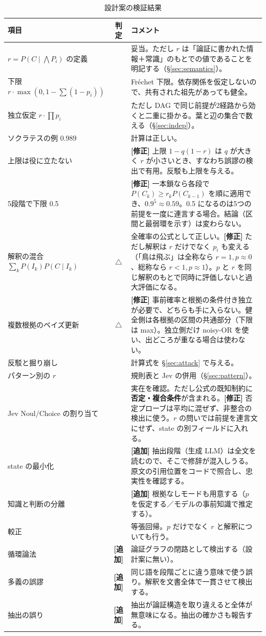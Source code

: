 \documentclass[a4paper,11pt]{ltjsarticle}
\newcommand{\okmark}{\ding{51}}
\newcommand{\ngmark}{\ding{55}}
\newcommand{\fix}[1]{\textcolor{blue!60!black}{\textbf{[修正]} #1}}
\newcommand{\add}[1]{\textcolor{green!40!black}{\textbf{[追加]} #1}}
\begin{document}
\begin{table}[htbp]
\centering
\caption{設計案の検証結果}\label{tab:review}
\small
\begin{tabularx}{\linewidth}{lcX}
\toprule
項目 & 判定 & コメント \\
\midrule
$r = P(C\mid \bigwedge P_i)$ の定義 & \okmark & 妥当。ただし $r$ は「論証に書かれた情報＋常識」のもとでの値であることを明記する（§\ref{sec:semantics}）。\\
下限 $r\cdot\max(0,1-\sum(1-p_i))$ & \okmark & Fréchet 下限。依存関係を仮定しないので、共有された祖先があっても健全。\\
独立仮定 $r\cdot\prod p_i$ & \okmark & ただし DAG で同じ前提が2経路から効くと二重に掛かる。葉と辺の集合で数える（§\ref{sec:indep}）。\\
ソクラテスの例 $0.989$ & \okmark & 計算は正しい。\\
上限は役に立たない & \ngmark & \fix{上限 $1-q(1-r)$ は $q$ が大きく $r$ が小さいとき、すなわち誤謬の検出で有用。反駁も上限を与える。}\\
5段階で下限 0.5 & \ngmark & \fix{一本鎖なら各段で $P(C_k)\ge r_k P(C_{k-1})$ を順に適用でき、$0.9^5\approx0.59$。0.5 になるのは5つの前提を一度に連言する場合。結論（区間と最弱環を示す）は変わらない。}\\
解釈の混合 $\sum_k P(I_k)P(C\mid I_k)$ & $\triangle$ & 全確率の公式として正しい。\fix{ただし解釈は $r$ だけでなく $p_i$ も変える（「鳥は飛ぶ」は全称なら $r=1, p\approx0$、総称なら $r<1, p\approx1$）。$p$ と $r$ を同じ解釈のもとで同時に評価しないと過大評価になる。}\\
複数根拠のベイズ更新 & $\triangle$ & \fix{事前確率と根拠の条件付き独立が必要で、どちらも手に入らない。健全側は各根拠の区間の共通部分（下限は max）。独立側だけ noisy-OR を使い、出どころが重なる場合は使わない。}\\
反駁と掘り崩し & \okmark & 計算式を §\ref{sec:attack} で与える。\\
パターン別の $r$ & \okmark & 規則表と Jev の併用（§\ref{sec:pattern}）。\\
Jev Noul/Choice の割り当て & \okmark & 実在を確認。ただし公式の既知制約に\textbf{否定・複合条件}が含まれる。\fix{否定プローブは平均に混ぜず、非整合の検出に使う。$r$ の問いでは前提を連言文にせず、state の別フィールドに入れる。}\\
state の最小化 & \okmark & \add{抽出段階（生成 LLM）は全文を読むので、そこで修辞が混入しうる。原文の引用位置をコードで照合し、忠実性を確認する。}\\
知識と判断の分離 & \okmark & \add{根拠なしモードも用意する（$p$ を仮定する／モデルの事前知識で推定する）。}\\
較正 & \okmark & 等張回帰。$p$ だけでなく $r$ と解釈についても行う。\\
\midrule
循環論法 & \add{} & 論証グラフの閉路として検出する（設計案に無い）。\\
多義の誤謬 & \add{} & 同じ語を段階ごとに違う意味で使う誤り。解釈を文書全体で一貫させて検出する。\\
抽出の誤り & \add{} & 抽出が論証構造を取り違えると全体が無意味になる。抽出の確かさも報告する。\\
\bottomrule
\end{tabularx}
\end{table}
\end{document}
